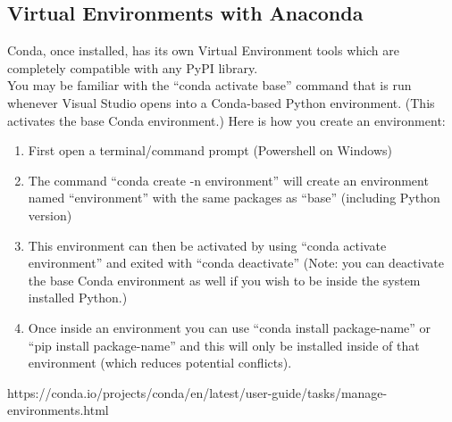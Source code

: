 \documentclass[12pt]{article}
\begin{document}
        \subsection{Virtual Environments with Anaconda}
            Conda, once installed, has its own Virtual Environment tools which are completely compatible with any PyPI library.
            \\You may be familiar with the “conda activate base” command that is run whenever Visual Studio opens into a Conda-based Python environment.
            (This activates the base Conda environment.)
            Here is how you create an environment:
            \begin{enumerate}
                \item First open a terminal/command prompt (Powershell on Windows)
                \item The command “conda create -n environment” will create an environment named “environment” with the same packages as “base”  (including Python version)
                \item This environment can then be activated by using “conda activate environment” and exited with “conda deactivate” (Note: you can deactivate the base Conda environment as well if you wish to be inside the system installed Python.)
                \item Once inside an environment you can use “conda install \textlangle package-name\textrangle” or “pip install \textlangle package-name\textrangle” and this will only be installed inside of that environment (which reduces potential conflicts).
            \end{enumerate}
            https://conda.io/projects/conda/en/latest/user-guide/tasks/manage-environments.html
\end{document}
